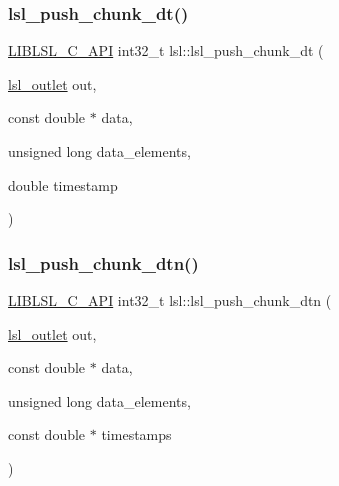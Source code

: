\subsubsection{\texorpdfstring{lsl\+\_\+push\+\_\+chunk\+\_\+dt()}{lsl\_push\_chunk\_dt()}}
{\footnotesize\ttfamily \hyperlink{lsl__cpp_8h_aafd0ef1813e8be84a1420c4f1df64615}{L\+I\+B\+L\+S\+L\+\_\+\+C\+\_\+\+A\+PI} int32\+\_\+t lsl\+::lsl\+\_\+push\+\_\+chunk\+\_\+dt (\begin{DoxyParamCaption}\item[{\hyperlink{namespacelsl_abcf512b0f66dacf86c10b165995fd50b}{lsl\+\_\+outlet}}]{out,  }\item[{const double $\ast$}]{data,  }\item[{unsigned long}]{data\+\_\+elements,  }\item[{double}]{timestamp }\end{DoxyParamCaption})}

\mbox{\label{namespacelsl_ae0a8ffad75240ca3d702944ebf7d7d53}} 
\subsubsection{\texorpdfstring{lsl\+\_\+push\+\_\+chunk\+\_\+dtn()}{lsl\_push\_chunk\_dtn()}}
{\footnotesize\ttfamily \hyperlink{lsl__cpp_8h_aafd0ef1813e8be84a1420c4f1df64615}{L\+I\+B\+L\+S\+L\+\_\+\+C\+\_\+\+A\+PI} int32\+\_\+t lsl\+::lsl\+\_\+push\+\_\+chunk\+\_\+dtn (\begin{DoxyParamCaption}\item[{\hyperlink{namespacelsl_abcf512b0f66dacf86c10b165995fd50b}{lsl\+\_\+outlet}}]{out,  }\item[{const double $\ast$}]{data,  }\item[{unsigned long}]{data\+\_\+elements,  }\item[{const double $\ast$}]{timestamps }\end{DoxyParamCaption})}

\mbox{\label{namespacelsl_a8a0e5cfc6b88e4dae3d4abd97ac47c38}} 
